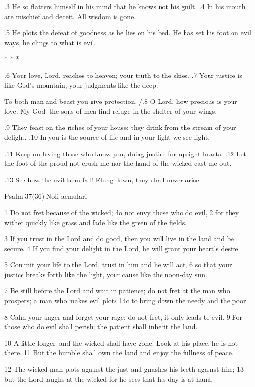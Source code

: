 .3 He so flatters himself in his mind
that he knows not his guilt.
.4 In his mouth are mischief and deceit.
All wisdom is gone.

.5 He plots the defeat of goodness
as he lies on his bed.
He has set his foot on evil ways,
he clings to what is evil.

* * *

.6 Your love, Lord, reaches to heaven;
your truth to the skies.
.7 Your justice is like God's mountain,
your judgments like the deep.

To both man and beast you give protection.
/.8 O Lord, how precious is your love.
My God, the sons of men
find refuge in the shelter of your wings.

.9 They feast on the riches of your house;
they drink from the stream of your delight.
.10 In you is the source of life
and in your light we see light.

.11 Keep on loving those who know you,
doing justice for upright hearts.
.12 Let the foot of the proud not crush me
nor the hand of the wicked cast me out.

.13 See how the evildoers fall!
Flung down, they shall never arise.


Psalm 37(36) Noli aemulari

1 Do not fret because of the wicked;
do not envy those who do evil,
2 for they wither quickly like grass
and fade like the green of the fields.

3 If you trust in the Lord and do good,
then you will live in the land and be secure.
4 If you find your delight in the Lord,
he will grant your heart's desire.

5 Commit your life to the Lord,
trust in him and he will act,
6 so that your justice breaks forth like the light,
your cause like the noon-day sun.

7 Be still before the Lord and wait in patience;
do not fret at the man who prospers;
a man who makes evil plots
14c to bring down the needy and the poor.

8 Calm your anger and forget your rage;
do not fret, it only leads to evil.
9 For those who do evil shall perish;
the patient shall inherit the land.

10 A little longer--and the wicked shall have gone.
Look at his place, he is not there.
11 But the humble shall own the land
and enjoy the fullness of peace.

12 The wicked man plots against the just
and gnashes his teeth against him;
13 but the Lord laughs at the wicked
for he sees that his day is at hand.

